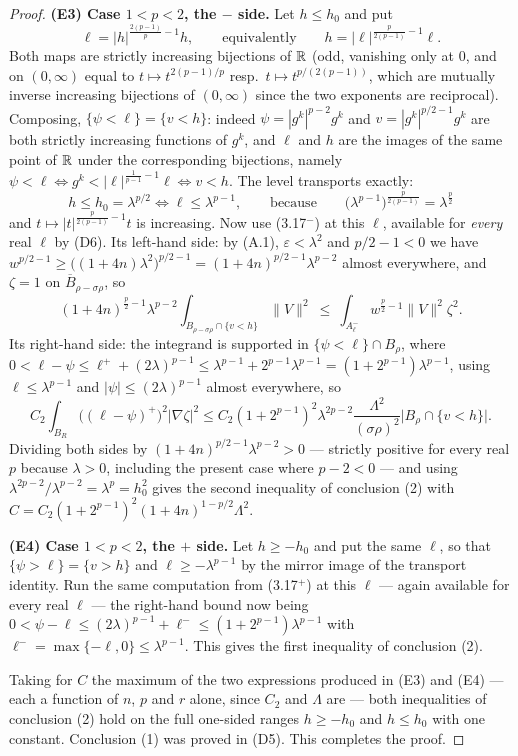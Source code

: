 \begin{proof}
\textbf{(E3) Case $1<p<2$, the $-$ side.}  Let $h\le h_0$ and put
\[
\ell=|h|^{\frac{2(p-1)}p-1}h ,
\qquad\text{equivalently}\qquad
h=|\ell|^{\frac p{2(p-1)}-1}\ell .
\]
Both maps are strictly increasing bijections of $\mathbb{R}$ (odd, vanishing only at
$0$, and on $(0,\infty)$ equal to $t\mapsto t^{2(p-1)/p}$ resp.\
$t\mapsto t^{p/(2(p-1))}$, which are mutually inverse increasing bijections of
$(0,\infty)$ since the two exponents are reciprocal).  Composing,
$\{\psi<\ell\}=\{v<h\}$: indeed $\psi=|g^k|^{p-2}g^k$ and $v=|g^k|^{p/2-1}g^k$
are both strictly increasing functions of $g^k$, and $\ell$ and $h$ are the
images of the same point of $\mathbb{R}$ under the corresponding bijections, namely
$\psi<\ell\iff g^k<|\ell|^{\frac1{p-1}-1}\ell\iff v<h$.  The level transports
exactly:
\[
h\le h_0=\lambda^{p/2}\iff\ell\le\lambda^{p-1},
\qquad\text{because}\qquad
\bigl(\lambda^{p-1}\bigr)^{\frac p{2(p-1)}}=\lambda^{\frac p2}
\]
and $t\mapsto|t|^{\frac p{2(p-1)}-1}t$ is increasing.  Now use (3.17$^-$) at
this $\ell$, available for \emph{every} real $\ell$ by (D6).  Its left-hand
side: by (A.1), $\varepsilon<\lambda^2$ and $p/2-1<0$ we have
$w^{p/2-1}\ge\bigl((1+4n)\lambda^2\bigr)^{p/2-1}=(1+4n)^{p/2-1}\lambda^{p-2}$
almost everywhere, and $\zeta=1$ on $\overline B_{\rho-\sigma\rho}$, so
\[
(1+4n)^{\frac p2-1}\lambda^{p-2}
\int_{B_{\rho-\sigma\rho}\cap\{v<h\}}\|V\|^2
\ \le\ \int_{A^-_\ell}w^{\frac p2-1}\|V\|^2\zeta^2 .
\]
Its right-hand side: the integrand is supported in $\{\psi<\ell\}\cap B_\rho$,
where $0<\ell-\psi\le\ell^++(2\lambda)^{p-1}\le\lambda^{p-1}
+2^{p-1}\lambda^{p-1}=(1+2^{p-1})\lambda^{p-1}$, using $\ell\le\lambda^{p-1}$
and $|\psi|\le(2\lambda)^{p-1}$ almost everywhere, so
\[
C_2\int_{B_R}\bigl((\ell-\psi)^+\bigr)^2|\nabla\zeta|^2
\le C_2(1+2^{p-1})^2\lambda^{2p-2}\frac{\Lambda^2}{(\sigma\rho)^2}
\bigl|B_\rho\cap\{v<h\}\bigr| .
\]
Dividing both sides by $(1+4n)^{p/2-1}\lambda^{p-2}>0$ --- strictly positive for
every real $p$ because $\lambda>0$, including the present case where $p-2<0$ ---
and using $\lambda^{2p-2}/\lambda^{p-2}=\lambda^p=h_0^2$ gives the second
inequality of conclusion (2) with
$C=C_2(1+2^{p-1})^2(1+4n)^{1-p/2}\Lambda^2$.

\textbf{(E4) Case $1<p<2$, the $+$ side.}  Let $h\ge-h_0$ and put the same
$\ell$, so that $\{\psi>\ell\}=\{v>h\}$ and $\ell\ge-\lambda^{p-1}$ by the
mirror image of the transport identity.  Run the same computation from
(3.17$^+$) at this $\ell$ --- again available for every real $\ell$ --- the
right-hand bound now being
$0<\psi-\ell\le(2\lambda)^{p-1}+\ell^-\le(1+2^{p-1})\lambda^{p-1}$ with
$\ell^-=\max\{-\ell,0\}\le\lambda^{p-1}$.  This gives the first inequality of
conclusion (2).

Taking for $C$ the maximum of the two expressions produced in (E3) and (E4) ---
each a function of $n$, $p$ and $r$ alone, since $C_2$ and $\Lambda$ are
--- both inequalities of conclusion (2) hold on the full one-sided ranges
$h\ge-h_0$ and $h\le h_0$ with one constant.  Conclusion (1) was proved in
(D5).  This completes the proof.
\end{proof}
